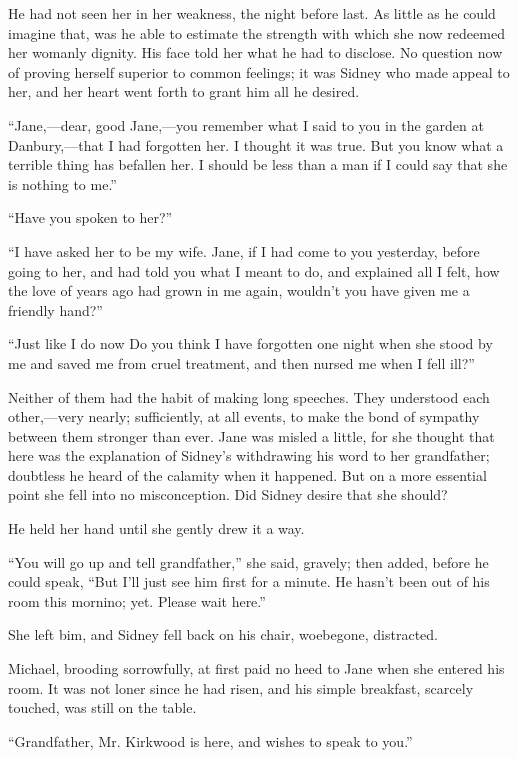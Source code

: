 He had not seen her in her weakness, the night before last. As little as
he could imagine that, was he able to estimate the strength with which
she now redeemed her womanly dignity. His face told her what he had to
disclose. No question now of proving herself superior to common
feelings; it was Sidney who made appeal to her, and her heart went forth
to grant him all he desired.

``Jane,---dear, good Jane,---you remember what I said to you in the
garden at Danbury,---that I had forgotten her. I thought it was true.
But you know what a terrible thing has befallen her. I should be less
than a man if I could say that she is nothing to me.''

``Have you spoken to her?''

``I have asked her to be my wife. Jane, if
{\protect\hypertarget{151}{}{}}I had come to you yesterday, before going
to her, and had told you what I meant to do, and explained all I felt,
how the love of years ago had grown in me again, wouldn't you have given
me a friendly hand?''

``Just like I do now Do you think I have forgotten one night when she
stood by me and saved me from cruel treatment, and then nursed me when I
fell ill?''

Neither of them had the habit of making long speeches. They understood
each other,---very nearly; sufficiently, at all events, to make the bond
of sympathy between them stronger than ever. Jane was misled a little,
for she thought that here was the explanation of Sidney's withdrawing
his word to her grandfather; doubtless he heard of the calamity when it
happened. But on a more essential point she fell into no misconception.
Did Sidney desire that she should?

He held her hand until she gently drew it a way.

``You will go up and tell grandfather,'' she said, gravely; then added,
before he could speak, ``But I'll just see him first for a minute. He
hasn't been out of his room this mornino; yet. Please wait here.''

{\protect\hypertarget{152}{}{}}She left bim, and Sidney fell back on his
chair, woebegone, distracted.

Michael, brooding sorrowfully, at first paid no heed to Jane when she
entered his room. It was not loner since he had risen, and his simple
breakfast, scarcely touched, was still on the table.

``Grandfather, Mr. Kirkwood is here, and wishes to speak to you.''

